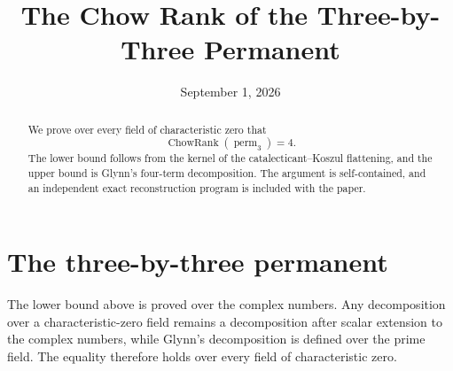 \documentclass[10pt,a4paper,reqno]{amsart}
\title{The Chow Rank of the Three-by-Three Permanent}
\author{}
\date{September 1, 2026}
\theoremstyle{definition}
\newcommand{\ChowRank}{\operatorname{ChowRank}}
\newcommand{\perm}{\operatorname{perm}}
\begin{document}
\begin{abstract}
We prove over every field of characteristic zero that
\[
  \ChowRank(\perm_3)=4.
\]
The lower bound follows from the kernel of the catalecticant--Koszul
flattening, and the upper bound is Glynn's four-term decomposition. The
argument is self-contained, and an independent exact reconstruction program
is included with the paper.
\end{abstract}
\maketitle

\section{The three-by-three permanent}


The lower bound above is proved over the complex numbers. Any decomposition
over a characteristic-zero field remains a decomposition after scalar
extension to the complex numbers, while Glynn's decomposition is defined over
the prime field. The equality therefore holds over every field of
characteristic zero.
\end{document}

